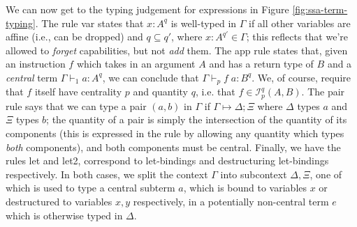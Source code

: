 \documentclass[acmsmall,screen,review]{acmart}
\newcommand{\mc}[1]{\ensuremath{\mathcal{#1}}}
\newcommand{\csplits}[3]{#1 \mapsto #2;#3}
\newcommand{\rle}[1]{{\scriptsize\textsf{#1}}}
\newcommand{\hasty}[5]{#1 \vdash_{#2} #3: {#4}^{#5}}
\begin{document}
We can now get to the typing judgement for expressions in Figure
\ref{fig:ssa-term-typing}. The rule \rle{var} states that \(x: A^q\) is
well-typed in \(\Gamma\) if all other variables are affine (i.e., can be
dropped) and \(q \subseteq q'\), where \(x: A^{q'} \in \Gamma\); this reflects
that we're allowed to \textit{forget} capabilities, but not \textit{add} them.
The \rle{app} rule states that, given an instruction \(f\) which takes in an
argument \(A\) and has a return type of \(B\) and a \textit{central} term
\(\hasty{\Gamma}{1}{a}{A}{q}\), we can conclude that
\(\hasty{\Gamma}{p}{f\;a}{B}{q}\). We, of course, require that \(f\) itself have
centrality \(p\) and quantity \(q\), i.e. that \(f \in \mc{I}_p^q(A, B)\). The
\rle{pair} rule says that we can type a pair \((a, b)\) in \(\Gamma\) if
\(\csplits{\Gamma}{\Delta}{\Xi}\) where \(\Delta\) types \(a\) and \(\Xi\) types
\(b\); the quantity of a pair is simply the intersection of the quantity of its
components (this is expressed in the rule by allowing any quantity which types
\textit{both} components), and both components must be central. Finally, we have
the rules \rle{let} and \rle{let2}, correspond to let-bindings and destructuring
let-bindings respectively. In both cases, we split the context \(\Gamma\) into
subcontext \(\Delta, \Xi\), one of which is used to type a central subterm
\(a\), which is bound to variables \(x\) or destructured to variables \(x, y\)
respectively, in a potentially non-central term \(e\) which is otherwise typed
in \(\Delta\).
\end{document}
